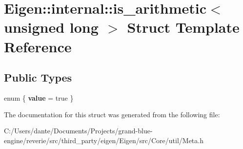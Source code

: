 \hypertarget{struct_eigen_1_1internal_1_1is__arithmetic_3_01unsigned_01long_01_4}{}\section{Eigen\+::internal\+::is\+\_\+arithmetic$<$ unsigned long $>$ Struct Template Reference}
\label{struct_eigen_1_1internal_1_1is__arithmetic_3_01unsigned_01long_01_4}
\subsection*{Public Types}
\begin{DoxyCompactItemize}
\item 
\mbox{\label{struct_eigen_1_1internal_1_1is__arithmetic_3_01unsigned_01long_01_4_a22da8d9223b4f8ff6cccbbe9b0ce7dad}} 
enum \{ {\bfseries value} = true
 \}
\end{DoxyCompactItemize}


The documentation for this struct was generated from the following file\+:\begin{DoxyCompactItemize}
\item 
C\+:/\+Users/dante/\+Documents/\+Projects/grand-\/blue-\/engine/reverie/src/third\+\_\+party/eigen/\+Eigen/src/\+Core/util/Meta.\+h\end{DoxyCompactItemize}
